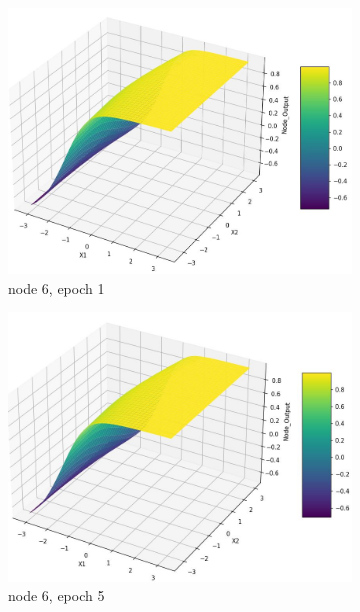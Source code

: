 \documentclass[11pt]{article}
\begin{document}
\begin{figure}[h!]
\begin{subfigure}[b]{0.3\textwidth}
	\includegraphics[scale=0.14]{hidden2_n6_e1.jpg}
	\caption{node 6, epoch 1}
	\label{fig:fig2.1.7.11}
	\end{subfigure}
	\begin{subfigure}[b]{0.3\textwidth}
	\centering
	\includegraphics[scale=0.14]{hidden2_n6_e5.jpg}
	\caption{node 6, epoch 5}
	\label{fig:fig2.1.7.12}
	\end{subfigure}
	\begin{subfigure}[b]{0.3\textwidth}
	\centering

\end{subfigure}
\end{figure}
\end{document}
